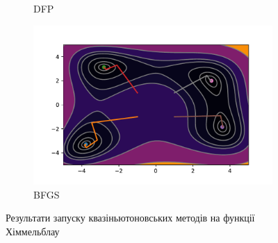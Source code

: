 \begin{figure}[h!]
\begin{subfigure}{0.5\textwidth}
        \caption{DFP}
    \end{subfigure}
    \begin{subfigure}{0.5\textwidth}
        \includegraphics[width=\textwidth, trim=1cm 0.5cm 1.3cm 1cm, clip]{assets/BFGS/himmelblau.pdf}
        \caption{BFGS}
    \end{subfigure}
    \caption{Результати запуску квазіньютоновських методів на функції Хіммельблау}
\end{figure}

